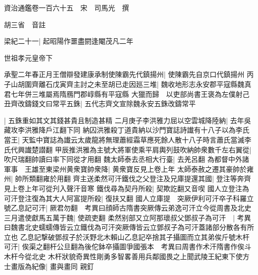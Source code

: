 資治通鑑卷一百六十五　宋　司馬光　撰

胡三省　音註

梁紀二十一|{
	起昭陽作噩盡閼逢閹茂凡二年}


世祖孝元皇帝下

承聖二年春正月王僧辯發建康承制使陳霸先代鎮揚州|{
	使陳霸先自京口代鎮揚州}
丙子山胡圍齊離石戊寅齊主討之未至胡已走因廵三堆|{
	魏收地形志永安郡平寇縣魏真君七年併三堆屬焉隋鴈門郡崞縣有平寇縣}
大獵而歸　以吏部尚書王褒為左僕射己丑齊改鑄錢文曰常平五銖|{
	五代志齊文宣除魏永安五銖改鑄常平}


|{
	五銖重如其文其錢甚貴且制造甚精}
二月庚子李洪雅力屈以空雲城降陸納|{
	去年吳藏攻李洪雅降戶江翻下同}
納囚洪雅殺丁道貴納以沙門寶誌詩䜟有十八子以為李氏當王|{
	天監中寶誌為䜟云太歲龍將無理蕭經霜草應死餘人散十八子時言蕭氏當滅李氏代興䜟楚譛翻}
甲辰推洪雅為主號大將軍使乘平肩輿列鼓吹納帥衆數千左右翼從|{
	吹尺瑞翻帥讀曰率下同從才用翻}
魏太師泰去丞相大行臺|{
	去羌呂翻}
為都督中外諸軍事　王雄至東梁州黄衆寶帥衆降|{
	黄衆寶反見上卷上年}
太師泰赦之遷其豪帥於雍州|{
	帥所類翻雍於用翻}
齊主送柔然可汗鐵伐之父登注及兄庫提還其國|{
	登注等奔齊見上卷上年可從刋入聲汗音寒}
鐵伐尋為契丹所殺|{
	契欺訖翻又音喫}
國人立登注為可汗登注復為其大人阿富提所殺|{
	復扶又翻}
國人立庫提　突厥伊利可汗卒子科羅立號乙息記可汗|{
	厥君勿翻　考異曰顔師古隋書突厥傳云弟逸可汗立今從周書及北史}
三月遣使獻馬五萬于魏|{
	使疏吏翻}
柔然别部又立阿那瓌叔父鄧叔子為可汗　|{
	考異曰魏書北史蠕蠕傳皆云立鐵伐為可汗突厥傳皆云立鄧叔子為可汗蓋諸部分散各有所立也}
乙息記撃破鄧叔子於沃野北木賴山乙息記卒捨其子攝圖而立其弟俟斤號木杆可汗|{
	俟渠之翻杆公旦翻為後佗鉢卒攝圖爭國張本　考異曰周書作术汗隋書作俟斗木杆今從北史}
木杆狀貌奇異性剛勇多智畧善用兵鄰國畏之上聞武陵王紀東下使方士畫版為紀像|{
	畫與畫同}
親釘

